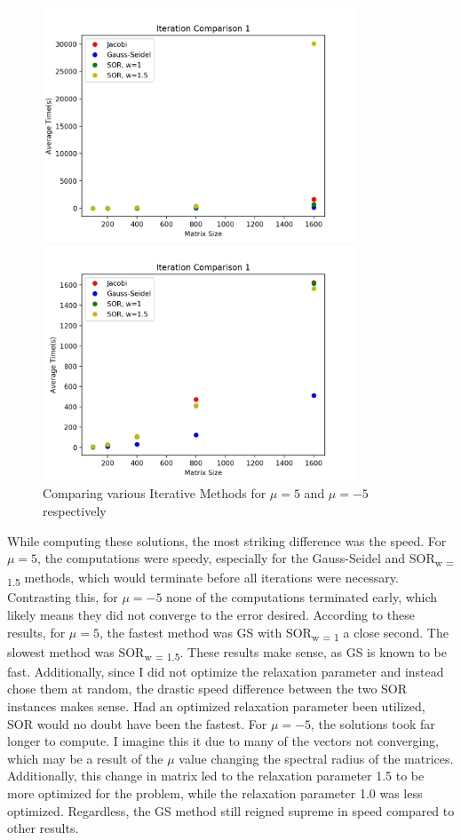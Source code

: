 \documentclass{article}
\begin{document}
\begin{figure}[H]
\centering
\caption{Comparing various Iterative Methods for $\mu = 5$ and $\mu = -5$ respectively}
\begin{minipage}[b]{0.4\textwidth}
\includegraphics[height=7cm]{p4}	
\end{minipage}
\hspace{0.6in}
\begin{minipage}[b]{0.4\textwidth}
\centering
\includegraphics[height=7cm]{p4_2}	
\end{minipage}
\end{figure}

While computing these solutions, the most striking difference was the speed.
For $\mu = 5$, the computations were speedy, especially for the Gauss-Seidel and SOR\textsubscript{w = 1.5} methods, which would terminate before all iterations were necessary. 
Contrasting this, for $\mu = -5$ none of the computations terminated early, which likely means they did not converge to the error desired. 
According to these results, for $\mu = 5$, the fastest method was GS with SOR\textsubscript{w = 1} a close second. 
The slowest method was SOR\textsubscript{w = 1.5}. 
These results make sense, as GS is known to be fast. 
Additionally, since I did not optimize the relaxation parameter and instead chose them at random, the drastic speed difference between the two SOR instances makes sense. 
Had an optimized relaxation parameter been utilized, SOR would no doubt have been the fastest.
For $\mu = -5$, the solutions took far longer to compute. 
I imagine this it due to many of the vectors not converging, which may be a result of the $\mu$ value changing the spectral radius of the matrices.
Additionally, this change in matrix led to the relaxation parameter 1.5 to be more optimized for the problem, while the relaxation parameter 1.0 was less optimized.
Regardless, the GS method still reigned supreme in speed compared to other results. 
 
\end{document}
